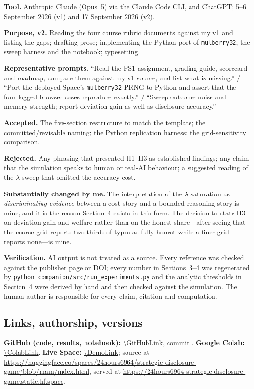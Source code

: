 \textbf{Tool.} Anthropic Claude (Opus~5) via the Claude Code CLI, and ChatGPT;
5--6 September 2026 (v1) and 17 September 2026 (v2).

\textbf{Purpose, v2.} Reading the four course rubric documents against my v1 and
listing the gaps; drafting prose; implementing the Python port of
\texttt{mulberry32}, the sweep harness and the notebook; typesetting.

\textbf{Representative prompts.} ``Read the PS1 assignment, grading guide,
scorecard and roadmap, compare them against my v1 source, and list what is
missing.'' / ``Port the deployed Space's \texttt{mulberry32} PRNG to Python and
assert that the four logged browser cases reproduce exactly.'' / ``Sweep outcome
noise and memory strength; report deviation gain as well as disclosure
accuracy.''

\textbf{Accepted.} The five-section restructure to match the template; the
committed/revisable naming; the Python replication harness; the grid-sensitivity
comparison.

\textbf{Rejected.} Any phrasing that presented H1--H3 as established findings;
any claim that the simulation speaks to human or real-AI behaviour; a suggested
reading of the $\lambda$ sweep that omitted the accuracy cost.

\textbf{Substantially changed by me.} The interpretation of the $\lambda$
saturation as \emph{discriminating evidence} between a cost story and a
bounded-reasoning story is mine, and it is the reason Section~4 exists in this
form. The decision to state H3 on deviation gain and welfare rather than on the
honest share---after seeing that the coarse grid reports two-thirds of types as
fully honest while a finer grid reports none---is mine.

\textbf{Verification.} AI output is not treated as a source. Every reference was
checked against the publisher page or DOI; every number in Sections~3--4 was
regenerated by \texttt{python companion/src/run\_experiments.py} and the analytic
thresholds in Section~4 were derived by hand and then checked against the
simulation. The human author is responsible for every claim, citation and
computation.

\subsection{Links, authorship, versions}
\textbf{GitHub (code, results, notebook):} \url{\GitHubLink}, commit
\texttt{\CommitHash}.\quad
\textbf{Google Colab:} \url{\ColabLink}.\quad
\textbf{Live Space:} \url{\DemoLink}; source at
\url{https://huggingface.co/spaces/24hours6964/strategic-disclosure-game/blob/main/index.html},
served at \url{https://24hours6964-strategic-disclosure-game.static.hf.space}.

